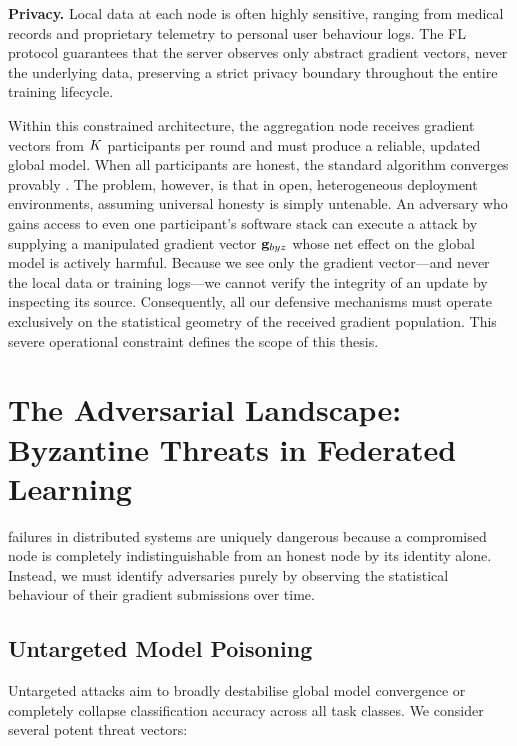 \documentclass[../main.tex]{subfiles}
\begin{document}
\textbf{Privacy.}
Local data at each node is often highly sensitive, ranging from medical records and proprietary telemetry to personal user behaviour logs. The FL protocol guarantees that the server observes only abstract gradient vectors, never the underlying data, preserving a strict privacy boundary throughout the entire training lifecycle.

Within this constrained architecture, the aggregation node receives gradient vectors from $K$ participants per round and must produce a reliable, updated global model. When all participants are honest, the standard \fedavg{} algorithm converges provably \citep{mcmahan2017communication}. The problem, however, is that in open, heterogeneous deployment environments, assuming universal honesty is simply untenable. An adversary who gains access to even one participant's software stack can execute a \byz{} attack by supplying a manipulated gradient vector $\mathbf{g}_{byz}$ whose net effect on the global model is actively harmful. Because we see only the gradient vector---and never the local data or training logs---we cannot verify the integrity of an update by inspecting its source. Consequently, all our defensive mechanisms must operate exclusively on the statistical geometry of the received gradient population. This severe operational constraint defines the scope of this thesis.

\section{The Adversarial Landscape: Byzantine Threats in Federated Learning}
\label{sec:intro_threats}

\byz{} failures in distributed systems are uniquely dangerous because a compromised node is completely indistinguishable from an honest node by its identity alone. Instead, we must identify adversaries purely by observing the statistical behaviour of their gradient submissions over time.

\subsection{Untargeted Model Poisoning}
\label{sec:intro_untargeted}

Untargeted attacks aim to broadly destabilise global model convergence or completely collapse classification accuracy across all task classes. We consider several potent threat vectors:
\end{document}
